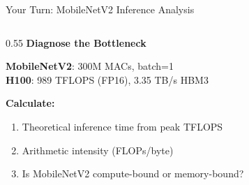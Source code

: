 \documentclass[aspectratio=169, 12pt]{beamer}
\begin{document}
\begin{frame}{Your Turn: MobileNetV2 Inference Analysis}

\footnotesize
\begin{columns}[T]
  \begin{column}{0.55\textwidth}
    {\small\bfseries Diagnose the Bottleneck}

    \vspace{0.15cm}
    \textbf{MobileNetV2}: 300M MACs, batch=1\\
    \textbf{H100}: 989 TFLOPS (FP16), 3.35 TB/s HBM3

    \vspace{0.1cm}
    \textbf{Calculate:}
    \begin{enumerate}\setlength\itemsep{0pt}
      \item Theoretical inference time from peak TFLOPS
      \item Arithmetic intensity (FLOPs/byte)
      \item Is MobileNetV2 compute-bound or memory-bound?
    \end{enumerate}


\end{column}
\end{columns}
\end{frame}
\end{document}
